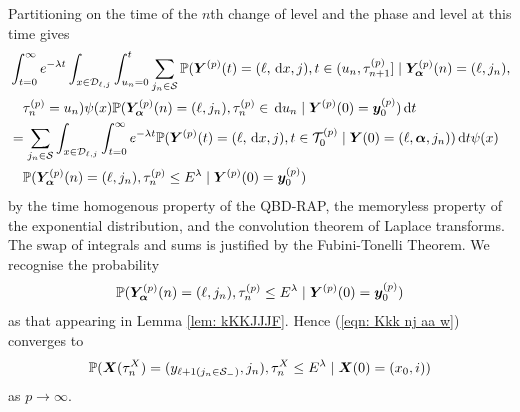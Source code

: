 Partitioning on the time of the \(n\)th change of level and the phase and level at this time gives
\begin{align}
	&\int_{t=0}^\infty e^{-\lambda t} 
	\int_{x\in\mathcal{D}_{\ell,j}}
	\int_{u_n=0}^t\sum_{j_n\in\mathcal S} \mathbb P({\boldsymbol Y}^{(p)}(t) = (\ell,\, \mathrm{d} x,j), 
	t \in(u_n, \tau_{n+1}^{(p)}] \mid\bm{Y}_{\bm{\alpha}}^{(p)}(n) = (\ell,j_n), \nonumber 
	\\&\quad \tau_{n}^{(p)}= u_n)\psi(x) \mathbb P(\bm{Y}_{\bm{\alpha}}^{(p)}(n) = (\ell, j_n), \tau_{n}^{(p)}\in \, \mathrm{d} u_n 
	 \mid \boldsymbol Y^{(p)}(0)=\boldsymbol y_0^{(p)}) 
	  \, \mathrm{d} t \nonumber 
	 \\&= \sum_{j_n\in\mathcal S}
	\int_{x\in\mathcal{D}_{\ell,j}} \int_{t=0}^\infty e^{-\lambda t} \mathbb P({\boldsymbol Y}^{(p)}(t) = (\ell,\, \mathrm{d} x, j), 
	t\in\mathcal T_{0}^{(p)} \mid\nonumber 
	  \boldsymbol Y(0) = (\ell,\boldsymbol\alpha,j_n))\, \mathrm{d} t \psi(x)  
	  \\&\quad{} \mathbb P(\bm{Y}_{\bm{\alpha}}^{(p)}(n) = (\ell,j_n), \tau_{n}^{(p)}\leq E^\lambda 
	 \mid \boldsymbol Y^{(p)}(0)=\boldsymbol y_0^{(p)}) \label{eqn: l whkrqvlkjbrd}
\end{align}
by the time homogenous property of the QBD-RAP, the memoryless property of the exponential distribution, and the convolution theorem of Laplace transforms. The swap of integrals and sums is justified by the Fubini-Tonelli Theorem. We recognise the probability 
\begin{align}
	\mathbb P(\bm{Y}_{\bm{\alpha}}^{(p)}(n) = (\ell, j_n), \tau_{n}^{(p)}\leq E^\lambda 
	 \mid \boldsymbol Y^{(p)}(0)=\boldsymbol y_0^{(p)}) \label{eqn: Kkk nj aa w}
\end{align}
as that appearing in Lemma \ref{lem: kKKJJJF}. Hence (\ref{eqn: Kkk nj aa w}) converges to 
\begin{align}
	\mathbb P(\boldsymbol X(\tau_n^X) = (y_{\ell+1(j_{n}\in\mathcal S_-)}, 
		j_n), \tau_{n}^X\leq E^\lambda
		\mid \boldsymbol X(0)=(x_0, i)) \label{eqn: ashverkjbvjhkhdsknacva}
\end{align}
as \(p\to\infty\). 


